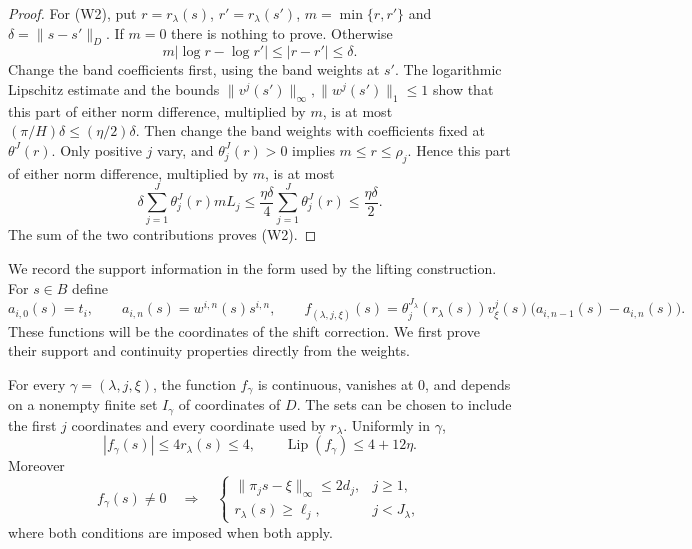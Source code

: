 \begin{proof}
For (W2), put $r=r_\lambda(s)$, $r'=r_\lambda(s')$,
$m=\min\{r,r'\}$ and $\delta=\|s-s'\|_D$.  If $m=0$ there is
nothing to prove.  Otherwise
\[
 m|\log r-\log r'|\leq|r-r'|\leq\delta.
\]
Change the band coefficients first, using the band weights at $s'$.
The logarithmic Lipschitz estimate and the bounds
$\|v^j(s')\|_\infty,\|w^j(s')\|_1\leq1$ show that this part of
either norm difference, multiplied by $m$, is at most
$(\pi/H)\delta\leq(\eta/2)\delta$.  Then change the band weights
with coefficients fixed at $\theta^J(r)$.  Only positive $j$ vary,
and $\theta^J_j(r)>0$ implies $m\leq r\leq\rho_j$.  Hence this
part of either norm difference, multiplied by $m$, is at most
\[
 \delta\sum_{j=1}^J\theta^J_j(r)mL_j
 \leq\frac{\eta\delta}{4}
       \sum_{j=1}^J\theta^J_j(r)
 \leq\frac{\eta\delta}{2}.
\]
The sum of the two contributions proves (W2).
\end{proof}

We record the support information in the form used by the lifting
construction.  For $s\in B$ define
\begin{equation}\label{eq:correction-coordinate}
 a_{i,0}(s)=t_i,\qquad
 a_{i,n}(s)=w^{i,n}(s)s^{i,n},\qquad
 f_{(\lambda,j,\xi)}(s)
   =\theta_j^{J_\lambda}(r_\lambda(s))v^j_\xi(s)
       \bigl(a_{i,n-1}(s)-a_{i,n}(s)\bigr).
\end{equation}
These functions will be the coordinates of the shift correction.
We first prove their support and continuity properties directly from
the weights.

\begin{lemma}
\label{lem:weight-support}
For every $\gamma=(\lambda,j,\xi)$, the function $f_\gamma$ is
continuous, vanishes at $0$, and depends on a nonempty finite set
$I_\gamma$ of coordinates of $D$.  The sets can be chosen to include
the first $j$ coordinates and every coordinate used by
$r_\lambda$.  Uniformly in $\gamma$,
\begin{equation}\label{eq:correction-bounds}
 |f_\gamma(s)|\leq4r_\lambda(s)\leq4,\qquad
 \operatorname{Lip}(f_\gamma)\leq4+12\eta.
\end{equation}
Moreover
\begin{equation}
 f_\gamma(s)\ne0\quad\Longrightarrow\quad
 \begin{cases}
 \|\pi_j s-\xi\|_\infty\leq2d_j,&j\geq1,\\
 r_\lambda(s)\geq\ell_j,&j<J_\lambda,
 \end{cases}                                                   \label{eq:correction-support}
\end{equation}
where both conditions are imposed when both apply.
\end{lemma}

